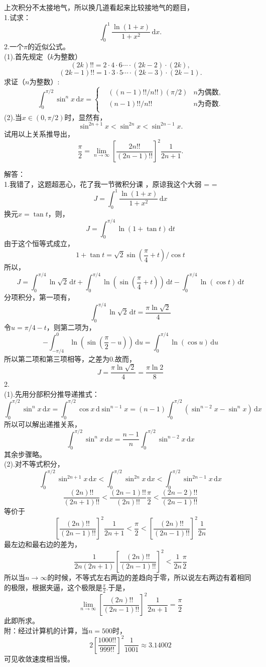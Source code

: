 \documentclass[11pt,a4paper,openany]{article}
\begin{document}
上次积分不太接地气，所以换几道看起来比较接地气的题目，\\
1.试求：
\[
\int_{0}^{1}\frac{\ln (1+x)}{1+x^2}\,\mathrm{d}x.
\]
2.一个$\pi$的近似公式。\\
(1).首先规定（$k$为整数）
$$(2k)!!=2\cdot4\cdot6\cdots\cdot(2k-2)\cdot(2k),
$$
$$(2k-1)!!=1\cdot3\cdot5\cdots\cdot(2k-3)\cdot(2k-1).
$$
求证（$n$为整数）:
$$ 
\int_0^{\pi/2}\sin^n x\,\mathrm{d}x
=
\left\{
\begin{array}{rcl}
&((n-1)!!/n!!)(\pi/2) &n\text{为偶数,}\\
&(n-1)!!/n!! &n\text{为奇数.}\\
\end{array}
\right .
$$
(2).当$x\in(0,\pi/2)$时，显然有，
\[
\sin^{2n+1}x < \sin^{2n}x <\sin^{2n-1}x.
\]
试用以上关系推导出，
\[
\frac{\pi}{2}=\lim_{n\rightarrow\infty}\left[\frac{2n!!}{(2n-1)!!}\right]^2
\frac{1}{2n+1}
.\]

\newpage
解答：\\
1.我错了，这题超恶心，花了我一节微积分课 ，原谅我这个大弱 = =
\[
J=\int^1_0 \frac{\ln(1+x)}{1+x^2}\,\mathrm{d}x
\]
换元$x=\tan t$，则，
\[
J=\int^{\pi/4}_0 \ln(1+\tan t)\,\mathrm{d}t
\]
由于这个恒等式成立，
\[
1+\tan t=\sqrt{2}\sin(\frac{\pi}{4}+t)/\cos t
\]
所以，
\[
J=\int^{\pi/4}_0 
\ln\sqrt{2}
\,\mathrm{d}t
+
\int^{\pi/4}_0 
\ln(\sin(\frac{\pi}{4}+t))
\,\mathrm{d}t
-
\int^{\pi/4}_0 
\ln(\cos t)
\,\mathrm{d}t
\]
分项积分，第一项有，
\[
\int^{\pi/4}_0 
\ln\sqrt{2}
\,\mathrm{d}t
=\frac{\pi \ln \sqrt{2}}{4}
\]
令$u=\pi/4-t$，则第二项为，
\[
-\int^{0}_{-\pi/4}
\ln(\sin(\frac{\pi}{2}-u))
\,\mathrm{d}u
=
\int^{\pi/4}_{0}
\ln(\cos u)
\,\mathrm{d}u
\]
所以第二项和第三项相等，之差为0.故而，
\[
J
=\frac{\pi \ln \sqrt{2}}{4}
=\frac{\pi \ln 2}{8}
\]
2.\\
(1).先用分部积分推导递推式：
\[
\int^{\pi/2}_{0}\sin^{n}x\,\mathrm{d}x
=\int^{\pi/2}_{0}\cos x\,\mathrm{d}\sin^{n-1}x
=(n-1)\int^{\pi/2}_{0}(\sin^{n-2}x-\sin^n x)\,\mathrm{d}x
\]
所以可以解出递推关系，
\[
\int^{\pi/2}_{0}\sin^{n}x\,\mathrm{d}x
=\frac{n-1}{n}\int^{\pi/2}_{0}
\sin^{n-2}x\,\mathrm{d}x
\]
其余步骤略。\\
(2).对不等式积分，
\[
\int^{\pi/2}_{0} \sin^{2n+1}x\,\mathrm{d}x <\int^{\pi/2}_{0} \sin^{2n}x \,\mathrm{d}x<\int^{\pi/2}_{0} \sin^{2n-1}x\,\mathrm{d}x
\]
\[
\frac{(2n)!!}{(2n+1)!!}
<
\frac{(2n-1)!!}{(2n)!!}\frac{\pi}{2}
<
\frac{(2n-2)!!}{(2n-1)!!}
\]
等价于
\[
\left[\frac{(2n)!!}{(2n-1)!!}
\right]^2\frac{1}{2n+1}
<
\frac{\pi}{2}
<
\left[\frac{(2n)!!}{(2n-1)!!}
\right]^2\frac{1}{2n}
\]
最左边和最右边的差为，
\[
\frac{1}{2n(2n+1)}
\left[\frac{(2n)!!}{(2n-1)!!}
\right]^2
<
\frac{1}{2n}\frac{\pi}{2}
\]
所以当$n\rightarrow\infty$的时候，不等式左右两边的差趋向于零，所以说左右两边有着相同的极限，根据夹逼，这个极限是$\displaystyle{\frac{\pi}{2}}$.于是，
\[
\lim_{n\rightarrow\infty}\left[\frac{(2n)!!}{(2n-1)!!}
\right]^2\frac{1}{2n+1}
=\frac{\pi}{2}
\]
此即所求。\\
附：经过计算机的计算，当$n=500$时，
\[
2\left[\frac{1000!!}{999!!}\right]^2
\frac{1}{1001}
\approx 3.14002
\]
可见收敛速度相当慢。
\end{document}
